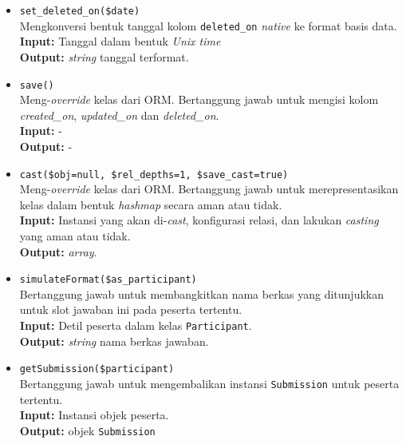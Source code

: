 \begin{itemize}
\begin{itemize}
                \item \texttt{set\_deleted\_on(\$date)} \\
                    Mengkonversi bentuk tanggal kolom \texttt{deleted\_on} \textit{native} ke 
                    format basis data. \\
                    \textbf{Input:} Tanggal dalam bentuk \textit{Unix time}\\
                    \textbf{Output:} \textit{string} tanggal terformat.
                    
                \item \texttt{save()}\\
                    Meng-\textit{override} kelas dari ORM. Bertanggung jawab untuk mengisi
                    kolom \textit{created\_on}, \textit{updated\_on} dan \textit{deleted\_on}.\\
                    \textbf{Input:} -\\
                    \textbf{Output:} -
                
                \item \texttt{cast(\$obj=null, \$rel\_depths=1, \$save\_cast=true)}\\
                    Meng-\textit{override} kelas dari ORM. Bertanggung jawab untuk merepresentasikan
                    kelas dalam bentuk \textit{hashmap} secara aman atau tidak. \\
                    \textbf{Input:} Instansi yang akan di-\textit{cast}, konfigurasi relasi, dan
                        lakukan \textit{casting} yang aman atau tidak.\\
                    \textbf{Output:} \textit{array}.
                    
                \item \texttt{simulateFormat(\$as\_participant)} \\
                    Bertanggung jawab untuk membangkitkan nama berkas yang ditunjukkan untuk
                    slot jawaban ini pada peserta tertentu. \\
                    \textbf{Input:} Detil peserta dalam kelas \texttt{Participant}.\\
                    \textbf{Output:} \textit{string} nama berkas jawaban.
                    
                \item \texttt{getSubmission(\$participant)} \\
                    Bertanggung jawab untuk mengembalikan instansi \texttt{Submission} untuk peserta
                    tertentu. \\
                    \textbf{Input:} Instansi objek peserta.\\
                    \textbf{Output:} objek \texttt{Submission}
                    

\end{itemize}
\end{itemize}
